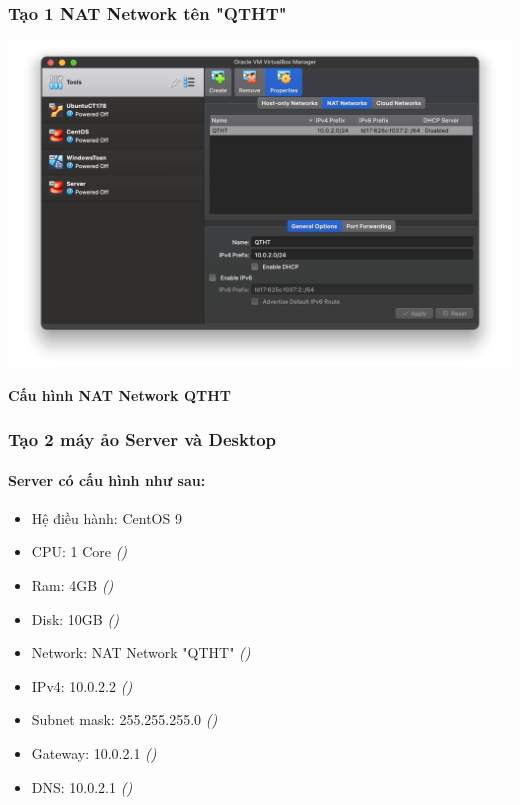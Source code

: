 \subsubsection{Tạo 1 NAT Network tên "QTHT"}

\begin{minipage}{.93\linewidth}
  \captionsetup{type=figure}
  \includegraphics[width=\linewidth]{./imgs/Hinh-2.png}
  \caption{\bfseries Cấu hình NAT Network QTHT}
\end{minipage}

\subsubsection{Tạo 2 máy ảo Server và Desktop}

\paragraph{Server có cấu hình như sau:}

\begin{itemize}
  \item Hệ điều hành: CentOS 9
  \item CPU: 1 Core \textit{()}
  \item Ram: 4GB \textit{()}
  \item Disk: 10GB \textit{()}
  \item Network: NAT Network "QTHT" \textit{()}
  \item IPv4: 10.0.2.2 \textit{()}
  \item Subnet mask: 255.255.255.0 \textit{()}
  \item Gateway: 10.0.2.1 \textit{()}
  \item DNS: 10.0.2.1 \textit{()}
\end{itemize}

